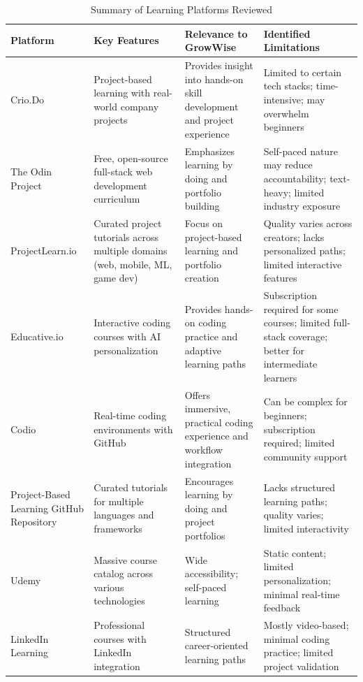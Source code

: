 \documentclass{FastFyp}
\begin{document}
\begin{table}[!htbp]
\footnotesize
\centering
\caption{Summary of Learning Platforms Reviewed}
\label{tab:literature_summary}
\begin{tabular}{|p{2.5cm}|p{3.5cm}|p{4cm}|p{4cm}|}
\hline
Platform & Key Features & Relevance to GrowWise & Identified Limitations \\
\hline
Crio.Do \cite{ref:CrioDo:2025} & Project-based learning with real-world company projects & Provides insight into hands-on skill development and project experience & Limited to certain tech stacks; time-intensive; may overwhelm beginners \\
\hline
The Odin Project \cite{ref:TheOdinProject} & Free, open-source full-stack web development curriculum & Emphasizes learning by doing and portfolio building & Self-paced nature may reduce accountability; text-heavy; limited industry exposure \\
\hline
ProjectLearn.io \cite{ref:ProjectLearn} & Curated project tutorials across multiple domains (web, mobile, ML, game dev) & Focus on project-based learning and portfolio creation & Quality varies across creators; lacks personalized paths; limited interactive features \\
\hline
Educative.io \cite{ref:Educative} & Interactive coding courses with AI personalization & Provides hands-on coding practice and adaptive learning paths & Subscription required for some courses; limited full-stack coverage; better for intermediate learners \\
\hline
Codio \cite{ref:Codio} & Real-time coding environments with GitHub & Offers immersive, practical coding experience and workflow integration & Can be complex for beginners; subscription required; limited community support \\
\hline
Project-Based Learning GitHub Repository \cite{ref:GitHubProjectBasedLearning} & Curated tutorials for multiple languages and frameworks & Encourages learning by doing and project portfolios & Lacks structured learning paths; quality varies; limited interactivity \\
\hline
Udemy \cite{ref:Udemy} & Massive course catalog across various technologies & Wide accessibility; self-paced learning & Static content; limited personalization; minimal real-time feedback \\
\hline
LinkedIn Learning \cite{ref:LinkedInLearning} & Professional courses with LinkedIn integration & Structured career-oriented learning paths & Mostly video-based; minimal coding practice; limited project validation \\

\end{tabular}
\end{table}
\end{document}
